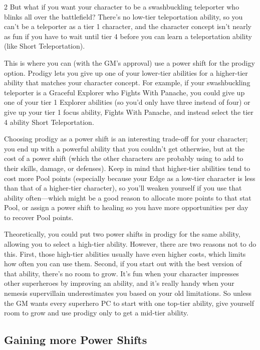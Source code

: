 \begin{multicols}{2}
But what if you want your character to be a swashbuckling teleporter who blinks all over the battlefield? There’s no low-tier teleportation ability, so you can’t be a teleporter as a tier 1 character, and the character concept isn’t nearly as fun if you have to wait until tier 4 before you can learn a teleportation ability (like Short Teleportation).

This is where you can (with the GM’s approval) use a power shift for the prodigy option. Prodigy lets you give up one of your lower-tier abilities for a higher-tier ability that matches your character concept. For example, if your swashbuckling teleporter is a Graceful Explorer who Fights With Panache, you could give up one of your tier 1 Explorer abilities (so you’d only have three instead of four) or give up your tier 1 focus ability, Fights With Panache, and instead select the tier 4 ability Short Teleportation.

Choosing prodigy as a power shift is an interesting trade-off for your character; you end up with a powerful ability that you couldn’t get otherwise, but at the cost of a power shift (which the other characters are probably using to add to their skills, damage, or defenses). Keep in mind that higher-tier abilities tend to cost more Pool points (especially because your Edge as a low-tier character is less than that of a higher-tier character), so you’ll weaken yourself if you use that ability often—which might be a good reason to allocate more points to that stat Pool, or assign a power shift to healing so you have more opportunities per day to recover Pool points.

Theoretically, you could put two power shifts in prodigy for the same ability, allowing you to select a high-tier ability. However, there are two reasons not to do this. First, those high-tier abilities usually have even higher costs, which limits how often you can use them. Second, if you start out with the best version of that ability, there’s no room to grow. It’s fun when your character impresses other superheroes by improving an ability, and it’s really handy when your nemesis supervillain underestimates you based on your old limitations. So unless the GM wants every superhero PC to start with one top-tier ability, give yourself room to grow and use prodigy only to get a mid-tier ability.

\subsection{Gaining more Power Shifts}


\end{multicols}
